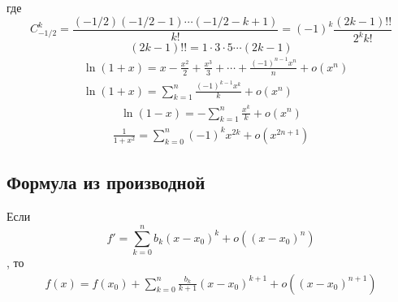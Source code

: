 \documentclass[a4paper,14pt]{article}
\begin{document}
    где
    \[C_{-1/2}^k=\frac{(-1/2)(-1/2-1)\cdots(-1/2-k+1)}{k!}=(-1)^k \frac{(2k-1)!!}{2^kk!}\]
    \[(2k-1)!!=1\cdot 3\cdot 5\cdots(2k-1)\]
    \begin{align}
        &\ln(1+x)=x-\frac{x^2}{2}+\frac{x^3}{3}+\cdots+\frac{(-1)^{n-1}x^n}{n}+o(x^n) \nonumber\\
        &\ln(1+x)=\sum_{k=1}^{n}\frac{(-1)^{k-1}x^k}{k}+o(x^n) 
    \end{align}
    \begin{align}
        \ln(1-x)=-\sum_{k=1}^{n} \frac{x^k}{k}+o(x^n)
    \end{align}
    \begin{align}
        \frac{1}{1+x^2}=\sum_{k=0}^{n} (-1)^kx^{2k}+o(x^{2n+1})
    \end{align}
    \subsection{Формула из производной}
    Если 
    \[f'=\sum_{k=0}^{n} b_k(x-x_0)^k+o\left((x-x_0)^n\right)\], то 
    \begin{align}
        f(x)=f(x_0)+\sum_{k=0}^{n} \frac{b_k}{k+1}(x-x_0)^{k+1}+o\left((x-x_0)^{n+1}\right)
    \end{align}
\end{document}
